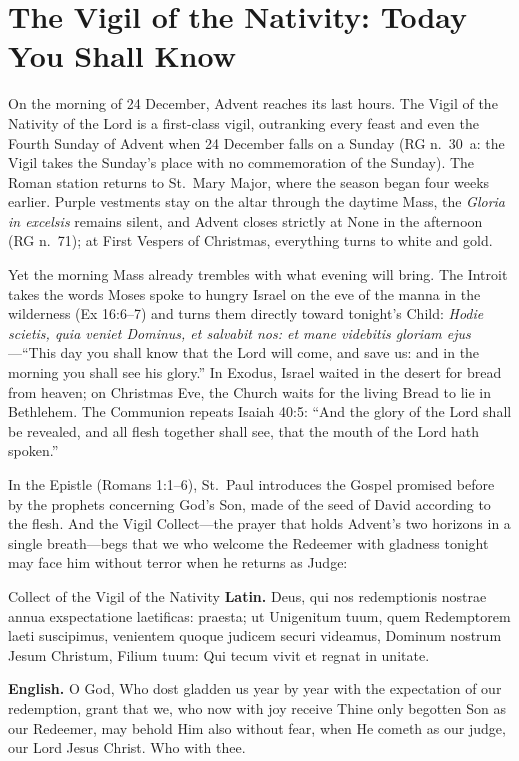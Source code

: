 \section{The Vigil of the Nativity: Today You Shall Know}\label{sec:vigil}

On the morning of 24 December, Advent reaches its last hours. The Vigil of the
Nativity of the Lord is a first-class vigil, outranking every feast and even
the Fourth Sunday of Advent when 24 December falls on a Sunday (RG n.~30~a: the
Vigil takes the Sunday's place with no commemoration of the Sunday). The Roman
station returns to St.~Mary Major, where the season began four weeks earlier.
Purple vestments stay on the altar through the daytime Mass, the \textit{Gloria
in excelsis} remains silent, and Advent closes strictly at None in the
afternoon (RG n.~71); at First Vespers of Christmas, everything turns to white
and gold.

Yet the morning Mass already trembles with what evening will bring. The Introit
takes the words Moses spoke to hungry Israel on the eve of the manna in the
wilderness (Ex 16:6--7) and turns them directly toward tonight's Child:
\textit{Hodie scietis, quia veniet Dominus, et salvabit nos: et mane videbitis
gloriam ejus}---``This day you shall know that the Lord will come, and save us:
and in the morning you shall see his glory.'' In Exodus, Israel waited in the
desert for bread from heaven; on Christmas Eve, the Church waits for the living
Bread to lie in Bethlehem. The Communion repeats Isaiah 40:5: ``And the glory
of the Lord shall be revealed, and all flesh together shall see, that the mouth
of the Lord hath spoken.''

In the Epistle (Romans 1:1--6), St.~Paul introduces the Gospel promised before
by the prophets concerning God's Son, made of the seed of David according to
the flesh. And the Vigil Collect---the prayer that holds Advent's two horizons
in a single breath---begs that we who welcome the Redeemer with gladness
tonight may face him without terror when he returns as Judge:

\begin{massbox}{Collect of the Vigil of the Nativity}
\textbf{Latin.} Deus, qui nos redemptionis nostrae annua exspectatione
laetificas: praesta; ut Unigenitum tuum, quem Redemptorem laeti suscipimus,
venientem quoque judicem securi videamus, Dominum nostrum Jesum Christum,
Filium tuum: Qui tecum vivit et regnat in unitate.

\textbf{English.} O God, Who dost gladden us year by year with the expectation
of our redemption, grant that we, who now with joy receive Thine only begotten
Son as our Redeemer, may behold Him also without fear, when He cometh as our
judge, our Lord Jesus Christ. Who with thee.
\end{massbox}

